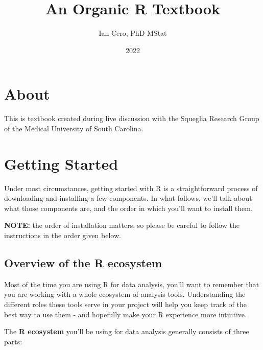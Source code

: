 \documentclass[
]{book}
\title{An Organic R Textbook}
\author{Ian Cero, PhD MStat}
\date{2022}
\begin{document}
\maketitle

{
\setcounter{tocdepth}{1}
\tableofcontents
}
\newpage

\hypertarget{about}{%
\chapter{About}\label{about}}

This is textbook created during live discussion with the Squeglia Research Group of the Medical University of South Carolina.

\hypertarget{getting-started}{%
\chapter{Getting Started}\label{getting-started}}

Under most circumstances, getting started with R is a straightforward process of downloading and installing a few components. In what follows, we'll talk about what those components are, and the order in which you'll want to install them.

\textbf{NOTE:} the order of installation matters, so please be careful to follow the instructions in the order given below.

\hypertarget{overview-of-the-r-ecosystem}{%
\section{Overview of the R ecosystem}\label{overview-of-the-r-ecosystem}}

Most of the time you are using R for data analysis, you'll want to remember that you are working with a whole ecosystem of analysis tools. Understanding the different roles these tools serve in your project will help you keep track of the best way to use them - and hopefully make your R experience more intuitive.

The \textbf{R ecosystem} you'll be using for data analysis generally consists of three parts:
\end{document}
